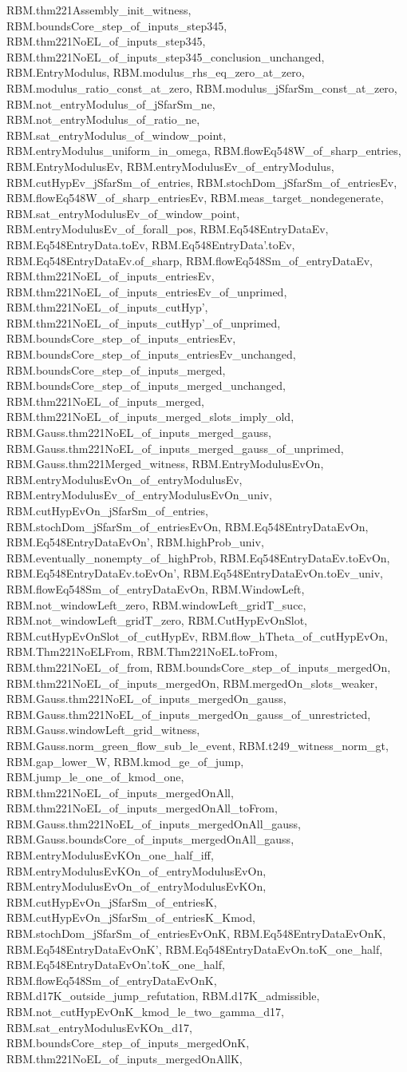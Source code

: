 \begin{theorem}
RBM.thm221Assembly_init_witness, RBM.boundsCore_step_of_inputs_step345, RBM.thm221NoEL_of_inputs_step345, RBM.thm221NoEL_of_inputs_step345_conclusion_unchanged, RBM.EntryModulus, RBM.modulus_rhs_eq_zero_at_zero, RBM.modulus_ratio_const_at_zero, RBM.modulus_jSfarSm_const_at_zero, RBM.not_entryModulus_of_jSfarSm_ne, RBM.not_entryModulus_of_ratio_ne, RBM.sat_entryModulus_of_window_point, RBM.entryModulus_uniform_in_omega, RBM.flowEq548W_of_sharp_entries, RBM.EntryModulusEv, RBM.entryModulusEv_of_entryModulus, RBM.cutHypEv_jSfarSm_of_entries, RBM.stochDom_jSfarSm_of_entriesEv, RBM.flowEq548W_of_sharp_entriesEv, RBM.meas_target_nondegenerate, RBM.sat_entryModulusEv_of_window_point, RBM.entryModulusEv_of_forall_pos, RBM.Eq548EntryDataEv, RBM.Eq548EntryData.toEv, RBM.Eq548EntryData'.toEv, RBM.Eq548EntryDataEv.of_sharp, RBM.flowEq548Sm_of_entryDataEv, RBM.thm221NoEL_of_inputs_entriesEv, RBM.thm221NoEL_of_inputs_entriesEv_of_unprimed, RBM.thm221NoEL_of_inputs_cutHyp', RBM.thm221NoEL_of_inputs_cutHyp'_of_unprimed, RBM.boundsCore_step_of_inputs_entriesEv, RBM.boundsCore_step_of_inputs_entriesEv_unchanged, RBM.boundsCore_step_of_inputs_merged, RBM.boundsCore_step_of_inputs_merged_unchanged, RBM.thm221NoEL_of_inputs_merged, RBM.thm221NoEL_of_inputs_merged_slots_imply_old, RBM.Gauss.thm221NoEL_of_inputs_merged_gauss, RBM.Gauss.thm221NoEL_of_inputs_merged_gauss_of_unprimed, RBM.Gauss.thm221Merged_witness, RBM.EntryModulusEvOn, RBM.entryModulusEvOn_of_entryModulusEv, RBM.entryModulusEv_of_entryModulusEvOn_univ, RBM.cutHypEvOn_jSfarSm_of_entries, RBM.stochDom_jSfarSm_of_entriesEvOn, RBM.Eq548EntryDataEvOn, RBM.Eq548EntryDataEvOn', RBM.highProb_univ, RBM.eventually_nonempty_of_highProb, RBM.Eq548EntryDataEv.toEvOn, RBM.Eq548EntryDataEv.toEvOn', RBM.Eq548EntryDataEvOn.toEv_univ, RBM.flowEq548Sm_of_entryDataEvOn, RBM.WindowLeft, RBM.not_windowLeft_zero, RBM.windowLeft_gridT_succ, RBM.not_windowLeft_gridT_zero, RBM.CutHypEvOnSlot, RBM.cutHypEvOnSlot_of_cutHypEv, RBM.flow_hTheta_of_cutHypEvOn, RBM.Thm221NoELFrom, RBM.Thm221NoEL.toFrom, RBM.thm221NoEL_of_from, RBM.boundsCore_step_of_inputs_mergedOn, RBM.thm221NoEL_of_inputs_mergedOn, RBM.mergedOn_slots_weaker, RBM.Gauss.thm221NoEL_of_inputs_mergedOn_gauss, RBM.Gauss.thm221NoEL_of_inputs_mergedOn_gauss_of_unrestricted, RBM.Gauss.windowLeft_grid_witness, RBM.Gauss.norm_green_flow_sub_le_event, RBM.t249_witness_norm_gt, RBM.gap_lower_W, RBM.kmod_ge_of_jump, RBM.jump_le_one_of_kmod_one, RBM.thm221NoEL_of_inputs_mergedOnAll, RBM.thm221NoEL_of_inputs_mergedOnAll_toFrom, RBM.Gauss.thm221NoEL_of_inputs_mergedOnAll_gauss, RBM.Gauss.boundsCore_of_inputs_mergedOnAll_gauss, RBM.entryModulusEvKOn_one_half_iff, RBM.entryModulusEvKOn_of_entryModulusEvOn, RBM.entryModulusEvOn_of_entryModulusEvKOn, RBM.cutHypEvOn_jSfarSm_of_entriesK, RBM.cutHypEvOn_jSfarSm_of_entriesK_Kmod, RBM.stochDom_jSfarSm_of_entriesEvOnK, RBM.Eq548EntryDataEvOnK, RBM.Eq548EntryDataEvOnK', RBM.Eq548EntryDataEvOn.toK_one_half, RBM.Eq548EntryDataEvOn'.toK_one_half, RBM.flowEq548Sm_of_entryDataEvOnK, RBM.d17K_outside_jump_refutation, RBM.d17K_admissible, RBM.not_cutHypEvOnK_kmod_le_two_gamma_d17, RBM.sat_entryModulusEvKOn_d17, RBM.boundsCore_step_of_inputs_mergedOnK, RBM.thm221NoEL_of_inputs_mergedOnAllK, 
\end{theorem}
